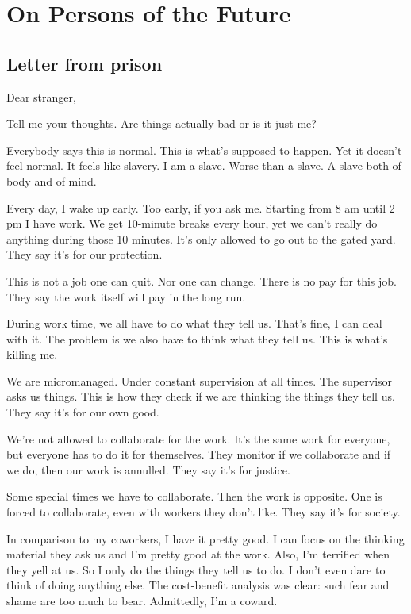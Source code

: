 \chapter{On Persons of the Future}

\section{Letter from prison}

Dear stranger,

Tell me your thoughts. Are things actually bad or is it just me?

Everybody says this is normal. This is what’s supposed to happen. Yet it doesn’t feel normal. It feels like slavery. I am a slave. Worse than a slave. A slave both of body and of mind.

Every day, I wake up early. Too early, if you ask me. Starting from 8 am until 2 pm I have work. We get 10-minute breaks every hour, yet we can’t really do anything during those 10 minutes. It’s only allowed to go out to the gated yard. They say it’s for our protection.

This is not a job one can quit. Nor one can change. There is no pay for this job. They say the work itself will pay in the long run.

During work time, we all have to do what they tell us. That’s fine, I can deal with it. The problem is we also have to think what they tell us. This is what’s killing me.

We are micromanaged. Under constant supervision at all times. The supervisor asks us things. This is how they check if we are thinking the things they tell us. They say it’s for our own good.

We’re not allowed to collaborate for the work. It’s the same work for everyone, but everyone has to do it for themselves. They monitor if we collaborate and if we do, then our work is annulled. They say it’s for justice.

Some special times we have to collaborate. Then the work is opposite. One is forced to collaborate, even with workers they don’t like. They say it’s for society.

In comparison to my coworkers, I have it pretty good. I can focus on the thinking material they ask us and I’m pretty good at the work. Also, I’m terrified when they yell at us. So I only do the things they tell us to do. I don’t even dare to think of doing anything else. The cost-benefit analysis was clear: such fear and shame are too much to bear. Admittedly, I’m a coward.

